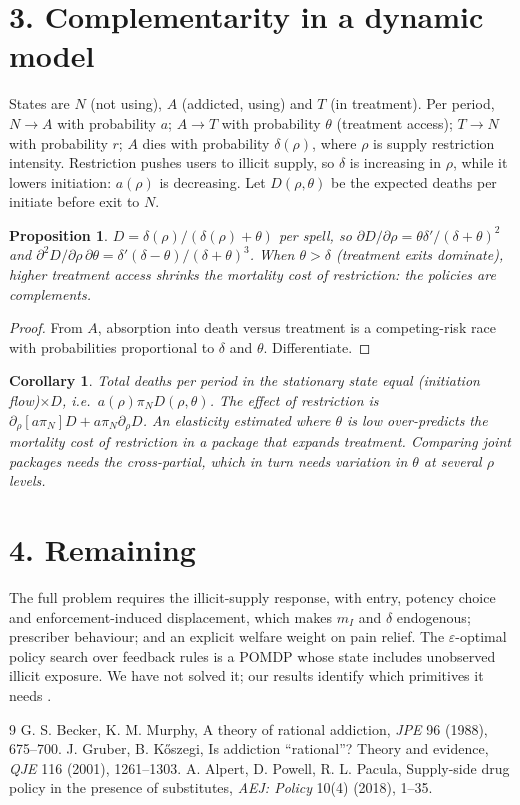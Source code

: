 \documentclass[11pt]{article}
\newtheorem{proposition}[theorem]{Proposition}
\newtheorem{corollary}[theorem]{Corollary}
\theoremstyle{definition}
\begin{document}
\section*{3. Complementarity in a dynamic model}
States are $N$ (not using), $A$ (addicted, using) and $T$ (in treatment). Per period, $N\to A$ with probability $a$;
$A\to T$ with probability $\theta$ (treatment access); $T\to N$ with probability $r$; $A$ dies with probability
$\delta(\rho)$, where $\rho$ is supply restriction intensity. Restriction pushes users to illicit supply, so $\delta$ is
increasing in $\rho$, while it lowers initiation: $a(\rho)$ is decreasing. Let $D(\rho,\theta)$ be the expected deaths per
initiate before exit to $N$.
\begin{proposition}\label{prop:comp}
$D=\delta(\rho)/(\delta(\rho)+\theta)$ per spell, so $\partial D/\partial\rho=\theta\delta'/(\delta+\theta)^2$ and
$\partial^2D/\partial\rho\,\partial\theta=\delta'(\delta-\theta)/(\delta+\theta)^3$. When $\theta>\delta$ (treatment
exits dominate), higher treatment access shrinks the mortality cost of restriction: the policies are complements.
\end{proposition}
\begin{proof}
From $A$, absorption into death versus treatment is a competing-risk race with probabilities proportional to $\delta$ and
$\theta$. Differentiate.
\end{proof}
\begin{corollary}
Total deaths per period in the stationary state equal (initiation flow)$\times D$, i.e.\ $a(\rho)\pi_N D(\rho,\theta)$. The
effect of restriction is $\partial_\rho[a\pi_N]D+a\pi_N\partial_\rho D$. An elasticity estimated where $\theta$ is low
over-predicts the mortality cost of restriction in a package that expands treatment. Comparing joint packages needs the
cross-partial, which in turn needs variation in $\theta$ at several $\rho$ levels.
\end{corollary}

\section*{4. Remaining}
The full problem requires the illicit-supply response, with entry, potency choice and enforcement-induced displacement,
which makes $m_I$ and $\delta$ endogenous; prescriber behaviour; and an explicit welfare weight on pain relief. The
$\varepsilon$-optimal policy search over feedback rules is a POMDP whose state includes unobserved illicit exposure. We
have not solved it; our results identify which primitives it needs \cite{bm,gk,app}.

\begin{thebibliography}{9}
 G. S. Becker, K. M. Murphy, A theory of rational addiction, \emph{JPE} 96 (1988), 675--700.
 J. Gruber, B. K\H{o}szegi, Is addiction ``rational''? Theory and evidence, \emph{QJE} 116 (2001), 1261--1303.
 A. Alpert, D. Powell, R. L. Pacula, Supply-side drug policy in the presence of substitutes, \emph{AEJ: Policy} 10(4) (2018), 1--35.
\end{thebibliography}
\end{document}
